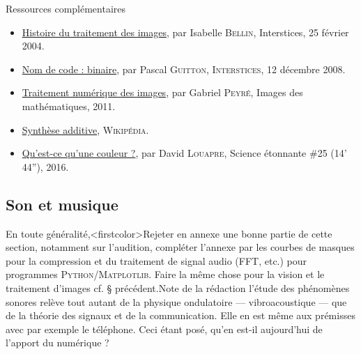 
\begin{gofurther}{Ressources complémentaires}
\begin{itemize}\jazzitem
	\item \href{https://interstices.info/histoire-du-traitement-dimages/}{Histoire du traitement des images}, par Isabelle \textsc{Bellin}, Interstices, 25 février 2004.
	\item \href{https://interstices.info/nom-de-code-binaire/}{Nom de code : binaire}, par Pascal \textsc{Guitton}, \textsc{Interstices}, 12 décembre 2008.
	\item \href{http://images.math.cnrs.fr/Le-traitement-numerique-des-images.html}{Traitement numérique des images}, par Gabriel \textsc{Peyré}, Images des mathématiques, 2011.
	\item \href{https://fr.wikipedia.org/wiki/Synth%C3%A8se_additive}{Synthèse additive}, \textsc{Wikipédia}.
\end{itemize}

\begin{itemize}\jazzitem
	\item \href{https://www.youtube.com/watch?v=FvbNrwjIrNU&feature=youtu.be&t=390}{Qu'est-ce qu'une couleur ?}, par David \textsc{Louapre}, Science étonnante \#25 (14'\,44''), 2016.
\end{itemize}
\end{gofurther}



\subsection[Son et musique]{Son et musique}
\label{sub:V.2.2}

En toute généralité,\caution[t]<firstcolor>{Rejeter en annexe une bonne partie de cette section, notamment sur l'audition, compléter l'annexe par les courbes de masques pour la compression et du traitement de signal audio (FFT, etc.) pour programmes \textsc{Python}/\textsc{Matplotlib}. Faire la même chose pour la vision et le traitement d'images cf. § précédent.}{Note de la rédaction}%
 l'étude des phénomènes sonores relève tout autant de la  physique ondulatoire --- vibroacoustique --- que de la théorie des signaux et de la communication. Elle en est même aux prémisses avec par exemple le téléphone. Ceci étant posé, qu'en est-il aujourd'hui de l'apport du numérique ?

